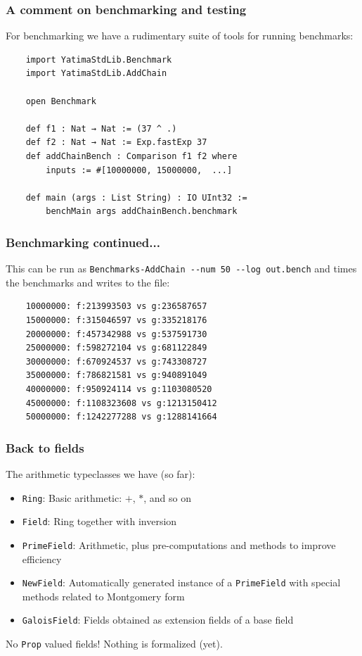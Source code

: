 \documentclass[options]{beamer}
\begin{document}
\begin{frame}[fragile]
    \frametitle{A comment on benchmarking and testing}

    For benchmarking we have a rudimentary suite of tools for running benchmarks:

    \begin{verbatim}
    import YatimaStdLib.Benchmark
    import YatimaStdLib.AddChain

    open Benchmark

    def f1 : Nat → Nat := (37 ^ .)
    def f2 : Nat → Nat := Exp.fastExp 37
    def addChainBench : Comparison f1 f2 where
        inputs := #[10000000, 15000000,  ...]

    def main (args : List String) : IO UInt32 := 
        benchMain args addChainBench.benchmark
    \end{verbatim}

\end{frame}

\begin{frame}[fragile]
    \frametitle{Benchmarking continued...}

    This can be run as \verb+Benchmarks-AddChain --num 50 --log out.bench+
    and times the benchmarks and writes to the file:

    \begin{verbatim}
    10000000: f:213993503 vs g:236587657
    15000000: f:315046597 vs g:335218176
    20000000: f:457342988 vs g:537591730
    25000000: f:598272104 vs g:681122849
    30000000: f:670924537 vs g:743308727
    35000000: f:786821581 vs g:940891049
    40000000: f:950924114 vs g:1103080520
    45000000: f:1108323608 vs g:1213150412
    50000000: f:1242277288 vs g:1288141664
    \end{verbatim}

\end{frame}

\begin{frame}[fragile]
    \frametitle{Back to fields}

    The arithmetic typeclasses we have (so far):

    \begin{itemize}
        \item \verb+Ring+: Basic arithmetic: $+$, $*$, and so on
        \item \verb+Field+: Ring together with inversion
        \item \verb+PrimeField+: Arithmetic, plus pre-computations and methods to improve efficiency
        \item \verb+NewField+: Automatically generated instance of a \verb+PrimeField+ with special methods related to Montgomery form
        \item \verb+GaloisField+: Fields obtained as extension fields of a base field
    \end{itemize}

    \vspace{6pt}
    \pause
    No \verb+Prop+ valued fields! Nothing is formalized (yet).

\end{frame}
\end{document}
